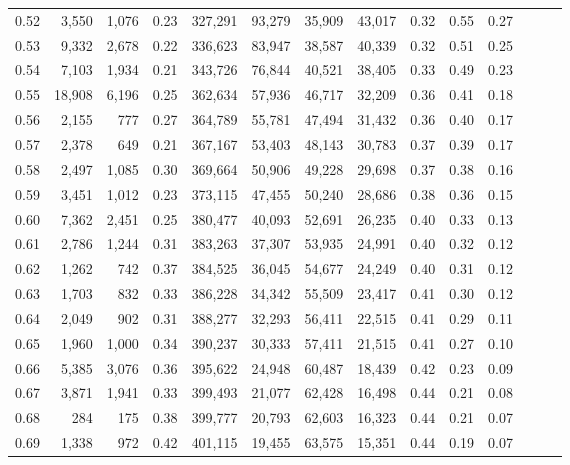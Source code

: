 \begin{tabular}{rrrrrrrrrrrrrr}
0.52 &   3,550 &  1,076 &  0.23 &  327,291 &   93,279 &  35,909 &  43,017 &  0.32 &  0.55 &      0.27 \\
0.53 &   9,332 &  2,678 &  0.22 &  336,623 &   83,947 &  38,587 &  40,339 &  0.32 &  0.51 &      0.25 \\
0.54 &   7,103 &  1,934 &  0.21 &  343,726 &   76,844 &  40,521 &  38,405 &  0.33 &  0.49 &      0.23 \\
0.55 &  18,908 &  6,196 &  0.25 &  362,634 &   57,936 &  46,717 &  32,209 &  0.36 &  0.41 &      0.18 \\
0.56 &   2,155 &    777 &  0.27 &  364,789 &   55,781 &  47,494 &  31,432 &  0.36 &  0.40 &      0.17 \\
0.57 &   2,378 &    649 &  0.21 &  367,167 &   53,403 &  48,143 &  30,783 &  0.37 &  0.39 &      0.17 \\
0.58 &   2,497 &  1,085 &  0.30 &  369,664 &   50,906 &  49,228 &  29,698 &  0.37 &  0.38 &      0.16 \\
0.59 &   3,451 &  1,012 &  0.23 &  373,115 &   47,455 &  50,240 &  28,686 &  0.38 &  0.36 &      0.15 \\
0.60 &   7,362 &  2,451 &  0.25 &  380,477 &   40,093 &  52,691 &  26,235 &  0.40 &  0.33 &      0.13 \\
0.61 &   2,786 &  1,244 &  0.31 &  383,263 &   37,307 &  53,935 &  24,991 &  0.40 &  0.32 &      0.12 \\
0.62 &   1,262 &    742 &  0.37 &  384,525 &   36,045 &  54,677 &  24,249 &  0.40 &  0.31 &      0.12 \\
0.63 &   1,703 &    832 &  0.33 &  386,228 &   34,342 &  55,509 &  23,417 &  0.41 &  0.30 &      0.12 \\
0.64 &   2,049 &    902 &  0.31 &  388,277 &   32,293 &  56,411 &  22,515 &  0.41 &  0.29 &      0.11 \\
0.65 &   1,960 &  1,000 &  0.34 &  390,237 &   30,333 &  57,411 &  21,515 &  0.41 &  0.27 &      0.10 \\
0.66 &   5,385 &  3,076 &  0.36 &  395,622 &   24,948 &  60,487 &  18,439 &  0.42 &  0.23 &      0.09 \\
0.67 &   3,871 &  1,941 &  0.33 &  399,493 &   21,077 &  62,428 &  16,498 &  0.44 &  0.21 &      0.08 \\
0.68 &     284 &    175 &  0.38 &  399,777 &   20,793 &  62,603 &  16,323 &  0.44 &  0.21 &      0.07 \\
0.69 &   1,338 &    972 &  0.42 &  401,115 &   19,455 &  63,575 &  15,351 &  0.44 &  0.19 &      0.07 \\

\end{tabular}

